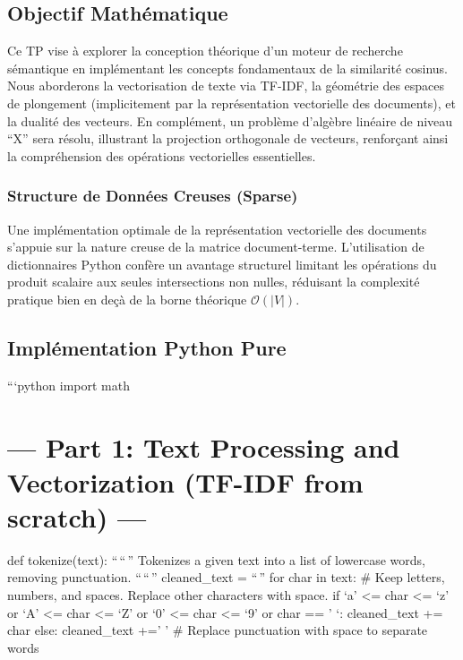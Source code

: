 \documentclass[11pt,a4paper]{report}
\begin{document}
\hypertarget{objectif-mathuxe9matique}{%
\subsection{Objectif Mathématique}\label{objectif-mathuxe9matique}}

Ce TP vise à explorer la conception théorique d'un moteur de recherche
sémantique en implémentant les concepts fondamentaux de la similarité
cosinus. Nous aborderons la vectorisation de texte via TF-IDF, la
géométrie des espaces de plongement (implicitement par la représentation
vectorielle des documents), et la dualité des vecteurs. En complément,
un problème d'algèbre linéaire de niveau ``X'' sera résolu, illustrant
la projection orthogonale de vecteurs, renforçant ainsi la compréhension
des opérations vectorielles essentielles.

\hypertarget{structure-de-donnuxe9es-creuses-sparse}{%
\subsubsection{Structure de Données Creuses
(Sparse)}\label{structure-de-donnuxe9es-creuses-sparse}}

Une implémentation optimale de la représentation vectorielle des
documents s'appuie sur la nature creuse de la matrice document-terme.
L'utilisation de dictionnaires Python confère un avantage structurel
limitant les opérations du produit scalaire aux seules intersections non
nulles, réduisant la complexité pratique bien en deçà de la borne
théorique \(\mathcal{O}(|V|)\).

\hypertarget{impluxe9mentation-python-pure}{%
\subsection{Implémentation Python
Pure}\label{impluxe9mentation-python-pure}}

```python import math

\hypertarget{part-1-text-processing-and-vectorization-tf-idf-from-scratch}{%
\section{--- Part 1: Text Processing and Vectorization (TF-IDF from
scratch)
---}\label{part-1-text-processing-and-vectorization-tf-idf-from-scratch}}

def tokenize(text): ``\,``\,'' Tokenizes a given text into a list of
lowercase words, removing punctuation. ``\,``\,'' cleaned\_text = ``\,''
for char in text: \# Keep letters, numbers, and spaces. Replace other
characters with space. if `a' \textless= char \textless= `z' or `A'
\textless= char \textless= `Z' or `0' \textless= char \textless= `9' or
char == ' `: cleaned\_text += char else: cleaned\_text +=' ' \# Replace
punctuation with space to separate words
\end{document}
